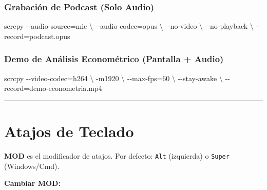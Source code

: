 \documentclass[
  doc,
  floatsintext,
  longtable,
  a4paper,
  nolmodern,
  notxfonts,
  notimes,
  12pt,
  colorlinks=true,linkcolor=blue,citecolor=blue,urlcolor=blue]{apa7}
\newenvironment{Shaded}{\begin{snugshade}}{\end{snugshade}}
\newcommand{\AttributeTok}[1]{\textcolor[rgb]{0.40,0.45,0.13}{#1}}
\newcommand{\DataTypeTok}[1]{\textcolor[rgb]{0.68,0.00,0.00}{#1}}
\newcommand{\ExtensionTok}[1]{\textcolor[rgb]{0.00,0.23,0.31}{#1}}
\newcommand{\NormalTok}[1]{\textcolor[rgb]{0.00,0.23,0.31}{#1}}
\newcommand{\OperatorTok}[1]{\textcolor[rgb]{0.37,0.37,0.37}{#1}}
\begin{document}
\subsubsection{Grabación de Podcast (Solo
Audio)}\label{grabaciuxf3n-de-podcast-solo-audio}

\begin{Shaded}
\begin{Highlighting}[]
\ExtensionTok{scrcpy} \AttributeTok{{-}{-}audio{-}source}\OperatorTok{=}\NormalTok{mic }\DataTypeTok{\textbackslash{}}
  \AttributeTok{{-}{-}audio{-}codec}\OperatorTok{=}\NormalTok{opus }\DataTypeTok{\textbackslash{}}
  \AttributeTok{{-}{-}no{-}video} \DataTypeTok{\textbackslash{}}
  \AttributeTok{{-}{-}no{-}playback} \DataTypeTok{\textbackslash{}}
  \AttributeTok{{-}{-}record}\OperatorTok{=}\NormalTok{podcast.opus}
\end{Highlighting}
\end{Shaded}

\subsubsection{Demo de Análisis Econométrico (Pantalla +
Audio)}\label{demo-de-anuxe1lisis-economuxe9trico-pantalla-audio}

\begin{Shaded}
\begin{Highlighting}[]
\ExtensionTok{scrcpy} \AttributeTok{{-}{-}video{-}codec}\OperatorTok{=}\NormalTok{h264 }\DataTypeTok{\textbackslash{}}
  \AttributeTok{{-}m1920} \DataTypeTok{\textbackslash{}}
  \AttributeTok{{-}{-}max{-}fps}\OperatorTok{=}\NormalTok{60 }\DataTypeTok{\textbackslash{}}
  \AttributeTok{{-}{-}stay{-}awake} \DataTypeTok{\textbackslash{}}
  \AttributeTok{{-}{-}record}\OperatorTok{=}\NormalTok{demo{-}econometria.mp4}
\end{Highlighting}
\end{Shaded}

\begin{center}\rule{0.5\linewidth}{0.5pt}\end{center}

\section{Atajos de Teclado}\label{atajos-de-teclado}

\textbf{MOD} es el modificador de atajos. Por defecto: \texttt{Alt}
(izquierda) o \texttt{Super} (Windows/Cmd).

\textbf{Cambiar MOD:}
\end{document}
